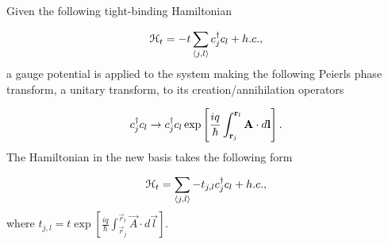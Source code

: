 
Given the following tight-binding Hamiltonian

\begin{equation}
  \mathcal{H}_t = -t \sum_{\langle j, l \rangle} c^{\dagger}_j c_{l} + h.c.,
\end{equation}
a gauge potential is applied to the system making the following Peierls phase transform, a unitary transform, to its creation/annihilation operators

\begin{align}
  c^{\dagger}_j c_l \rightarrow c^{\dagger}_j c_l \exp \left[{\frac{iq}{\hbar} \int^{\mathbf{r}_l}_{\mathbf{r}_j} \mathbf{A}\cdot d\mathbf{l}} \right].
\end{align}
The Hamiltonian in the new basis takes the following form

\begin{equation}
  \mathcal{H}_t = \sum_{\langle j, l \rangle} -t_{j,l} c^{\dagger}_j c_{l} + h.c.,
\end{equation}
where $t_{j,l} = t \exp \left[{\frac{iq}{\hbar} \int^{\vec{r}_l}_{\vec{r}_j} \vec{A}\cdot d\vec{l}} \right]$.

